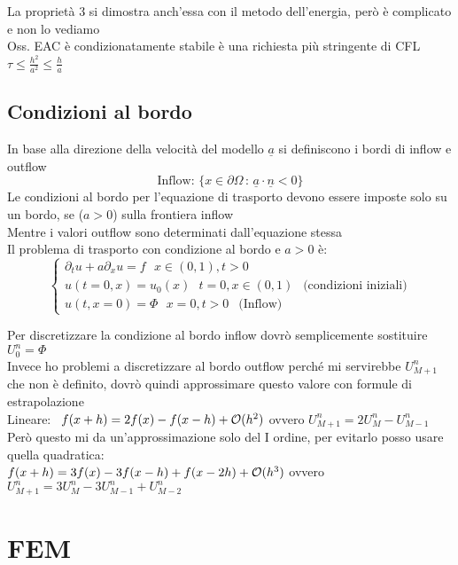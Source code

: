 \documentclass{article}
\renewcommand{\vv}[1]{\underline{#1}}
\begin{document}
La proprietà 3 si dimostra anch'essa con il metodo dell'energia, però è complicato e non lo vediamo\\
Oss. EAC è condizionatamente stabile è una richiesta più stringente di CFL \ $\tau\le \frac{h^2}{a^2}\le \frac{h}{a}$ \\

\subsection{Condizioni al bordo}

In base alla direzione della velocità del modello $\vv{a}$ si definiscono i bordi di inflow e outflow
\[
\text{Inflow: } \{x\in\partial\Omega \, : \, \vv{a}\cdot \vv{n} <0 \}
\]
Le condizioni al bordo per l'equazione di trasporto devono essere imposte solo su un bordo, se ($a>0$) sulla frontiera inflow\\
Mentre i valori outflow sono determinati dall'equazione stessa\\
Il problema di trasporto con condizione al bordo e $a>0$ è:
\[
\begin{cases}
    \partial_t u + a \partial_x u = f \ \ \ x\in (0,1), t>0\\
    u(t=0,x)=u_0(x) \ \ \ t=0, x\in (0,1) \ \ \text{ (condizioni iniziali)}\\ 
    u(t,x=0)=\Phi \ \ \ x=0, t>0 \ \ \text{ (Inflow)}
\end{cases}  
\]
\phantom{}

Per discretizzare la condizione al bordo inflow dovrò semplicemente sostituire $U_0^n=\Phi$\\

Invece ho problemi a discretizzare al bordo outflow perché mi servirebbe $U_{M+1}^n$ che non è definito, dovrò quindi approssimare questo valore con formule di estrapolazione\\
Lineare: \ $f(x+h)=2f(x)-f(x-h)+\mathcal O(h^2)$ ovvero $U_{M+1}^n=2U_M^n - U_{M-1}^n$ \\ Però questo mi da un'approssimazione solo del I ordine, per evitarlo posso usare quella quadratica: \\
$f(x+h)=3f(x)-3f(x-h)+ f(x-2h)+ \mathcal O(h^3)$ ovvero $U_{M+1}^n = 3U_M^n - 3U_{M-1}^n+U_{M-2}^n$\\


\newpage


\section{FEM}
\end{document}
